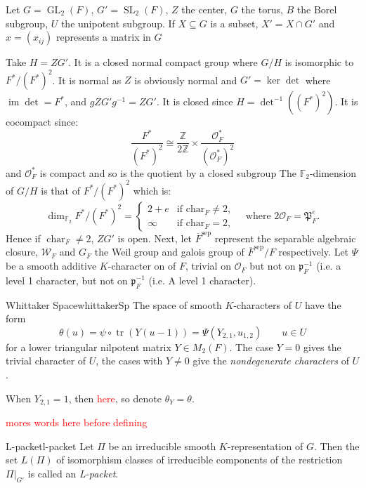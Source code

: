 \documentclass{article}
\newcommand{\F}{{\mathbb{F}}}
\newcommand{\Z}{{\mathbb{Z}}}
\newcommand{\CO}{{\mathcal{O}}}
\newcommand{\CW}{{\mathcal{W}}}
\newcommand{\fp}{{\mathfrak{p}}}
\newcommand{\FP}{{\mathfrak{P}}}
\newcommand{\im}{{\operatorname{im}}}
\newcommand{\tr}{{\operatorname{tr}}}
\newcommand{\GL}{{\operatorname{GL}}}
\newcommand{\SL}{{\operatorname{SL}}}
\newcommand{\sep}{{\operatorname{sep}}}
\newcommand{\Char}{{\operatorname{char}}}
\newcommand{\sse}{\subseteq}
\begin{document}
Let $G = \GL_2(F)$, $G' =\SL_2(F)$, $Z$ the center, $G$ the torus, $B$ the Borel subgroup, $U$ the unipotent
subgroup. If $X \sse G$ is a subset, $X' = X\cap G'$ and $x = (x_{ij})$ represents a matrix in $G$

Take $H= ZG'$. It is a closed normal compact group where $G/H$ is isomorphic to $F^*/(F^*)^2$. It is
normal as $Z$ is obviously normal and $G' = \ker\det$ where $\im\det = F^*$, and $gZG'g^{-1} = ZG'$. It is
closed since $H= \det^{-1}\left((F^*)^2\right)$. It is cocompact since:
\[
  \frac{F^*}{\left(F^*\right)^2} \cong \frac{\Z}{2\Z} \times \frac{\CO_F^*}{(\CO_F^*)^2}
\]
and $\CO_F^*$ is compact and so is the quotient by a closed subgroup The $\F_2$-dimension of $G/H$ is that of
$F^*/(F^*)^2$ which is:
\[
\dim_{\mathbb{F}_2} F^* / (F^*)^2 =
\begin{cases}
2 + e & \text{if } \text{char}_F \neq 2, \\
\infty & \text{if } \text{char}_F = 2,
\end{cases}
\quad \text{where } 2\CO_F = \FP_F^e.
\]
Hence if $\Char_F \ne 2$, $ZG'$ is open. Next, let $\overline{F}^\sep$ represent the separable algebraic
closure, $\CW_F$ and $G_F$ the Weil group and galois group of $\overline{F}^\sep/F$ respectively. Let $\Psi$
be a smooth additive $K$-character on of $F$, trivial on $\CO_F$ but not on $\fp_F^{-1}$ (i.e. a level
1 character, but not on $\fp_F^{-1}$ (i.e. A level 1 character).


\begin{defn}{Whittaker Space}{whittakerSp}
  The space of smooth $K$-characters of $U$ have the form
  \[
    \theta(u) = \psi \circ \tr(Y(u-1)) = \Psi(Y_{2,1}, u_{1,2}) \qquad u\in U
  \]
  for a lower triangular nilpotent matrix $Y \in M_2(F)$. The case $Y=0$ gives the trivial character of $U$,
  the cases with $Y\ne 0$ give the \emph{nondegenerate characters} of $U$.
\end{defn}

When $Y_{2,1} = 1$, then \textcolor{red}{here}, so denote $\theta_Y = \theta$.


\textcolor{red}{mores words here before defining}

\begin{defn}{L-packet}{l-packet}
Let \(\Pi\) be an irreducible smooth \(K\)-representation of \(G\). Then the set \(L(\Pi)\) of isomorphism classes
of irreducible components of the restriction \(\Pi|_{G'}\) is called an \emph{L-packet}.
\end{defn}
\end{document}
